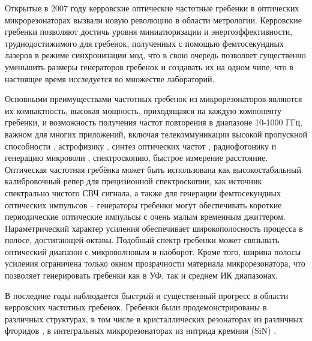 
{\actuality} Открытые в  2007 году керровские оптические частотные гребенки в оптических микрорезонаторах \cite{DelHaye2007,Kippenberg2011} вызвали новую революцию в области метрологии. Керровские гребенки позволяют достичь уровня миниатюризации и энергоэффективности, труднодостижимого для гребенок, полученных с помощью фемтосекундных лазеров в режиме синхронизации мод, что в свою очередь позволяет существенно уменьшить размеры генераторов гребенок и создавать их на одном чипе, что в настоящее время исследуется во множестве лабораторий.

Основными преимуществами частотных гребенок из микрорезонаторов являются их компактность, высокая мощность, приходящаяся на каждую компоненту гребенки, и возможность получения частот повторения в диапазоне 10-1000 ГГц, важном для многих приложений, включая телекоммуникации высокой пропускной способности \cite{Pfeifle2014}, астрофизику \cite{Glenday2015}, синтез оптических частот \cite{Ferdous2011}, радиофотонику и генерацию микроволн \cite{Xue2016,Savchenkov2008}, спектроскопию, быстрое измерение расстояние. Оптическая частотная гребёнка может быть использована как высокостабильный калибровочный репер для прецизионной спектроскопии, как источник спектрально чистого СВЧ сигнала, а также для генерации фемтосекундных оптических импульсов – генераторы гребенки могут обеспечивать короткие периодические оптические импульсы с очень малым временным джиттером. Параметрический характер усиления обеспечивает широкополосность процесса в полосе, достигающей октавы. Подобный спектр гребенки может связывать оптический диапазон с микроволновым и наоборот. Кроме того, ширина полосы усиления ограничена только окном прозрачности материала микрорезонатора, что позволяет генерировать гребенки как в УФ, так и среднем ИК диапазонах.

В последние годы наблюдается быстрый и существенный прогресс в области керровских частотных гребенок. Гребенки были продемонстрированы в различных структурах, в том числе в кристаллических резонаторах из различных фторидов \cite{Savchenkov2008,Grudinin2012,Jost2015,Liang2011,DelHaye2011,Chembo2010,Grudinin2009}, в интегральных микрорезонаторах из нитрида кремния (SiN) \cite{Levy2010,Okawachi2011,Johnson2012,Huang2015}.


